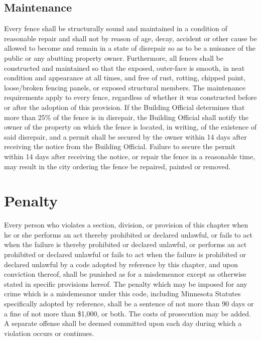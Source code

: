 \subsection{Maintenance}
Every fence shall be structurally sound and maintained in a condition of reasonable repair and shall not by reason of age, decay, accident or other cause be allowed to become and remain in a state of disrepair so as to be a nuisance of the public or any abutting property owner.  Furthermore, all fences shall be constructed and maintained so that the exposed, outer-face is smooth, in neat condition and appearance at all times, and free of rust, rotting, chipped paint, loose/broken fencing panels, or exposed structural members.  The maintenance requirements apply to every fence, regardless of whether it was constructed before or after the adoption of this provision.  If the Building Official determines that more than 25\% of the fence is in disrepair, the Building Official shall notify the owner of the property on which the fence is located, in writing, of the existence of said disrepair, and a permit shall be secured by the owner within 14 days after receiving the notice from the Building Official.  Failure to secure the permit within 14 days after receiving the notice, or repair the fence in a reasonable time, may result in the city ordering the fence be repaired, painted or removed.    

\setcounter{section}{98}
\section{Penalty}
Every person who violates a section, division, or provision of this chapter when he or she performs an act thereby prohibited or declared unlawful, or fails to act when the failure is thereby prohibited or declared unlawful, or performs an act prohibited or declared unlawful or fails to act when the failure is prohibited or declared unlawful by a code adopted by reference by this chapter, and upon conviction thereof, shall be punished as for a misdemeanor except as otherwise stated in specific provisions hereof. The penalty which may be imposed for any crime which is a misdemeanor under this code, including Minnesota Statutes specifically adopted by reference, shall be a sentence of not more than 90 days or a fine of not more than \$1,000, or both. The costs of prosecution may be added. A separate offense shall be deemed committed upon each day during which a violation occurs or continues.
